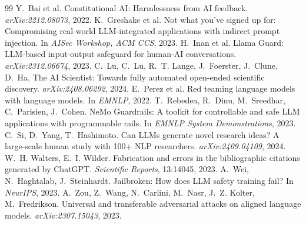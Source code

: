 \documentclass[10pt,twocolumn]{article}
\begin{document}
\small
\begin{thebibliography}{99}\setlength{\itemsep}{1pt}
 Y.~Bai et al. Constitutional AI: Harmlessness from AI feedback. \emph{arXiv:2212.08073}, 2022.
 K.~Greshake et al. Not what you've signed up for: Compromising real-world LLM-integrated applications with indirect prompt injection. In \emph{AISec Workshop, ACM CCS}, 2023.
 H.~Inan et al. Llama Guard: LLM-based input-output safeguard for human-AI conversations. \emph{arXiv:2312.06674}, 2023.
 C.~Lu, C.~Lu, R.~T. Lange, J.~Foerster, J.~Clune, D.~Ha. The AI Scientist: Towards fully automated open-ended scientific discovery. \emph{arXiv:2408.06292}, 2024.
 E.~Perez et al. Red teaming language models with language models. In \emph{EMNLP}, 2022.
 T.~Rebedea, R.~Dinu, M.~Sreedhar, C.~Parisien, J.~Cohen. NeMo Guardrails: A toolkit for controllable and safe LLM applications with programmable rails. In \emph{EMNLP System Demonstrations}, 2023.
 C.~Si, D.~Yang, T.~Hashimoto. Can LLMs generate novel research ideas? A large-scale human study with 100+ NLP researchers. \emph{arXiv:2409.04109}, 2024.
 W.~H. Walters, E.~I. Wilder. Fabrication and errors in the bibliographic citations generated by ChatGPT. \emph{Scientific Reports}, 13:14045, 2023.
 A.~Wei, N.~Haghtalab, J.~Steinhardt. Jailbroken: How does LLM safety training fail? In \emph{NeurIPS}, 2023.
 A.~Zou, Z.~Wang, N.~Carlini, M.~Nasr, J.~Z. Kolter, M.~Fredrikson. Universal and transferable adversarial attacks on aligned language models. \emph{arXiv:2307.15043}, 2023.
\end{thebibliography}
\end{document}
